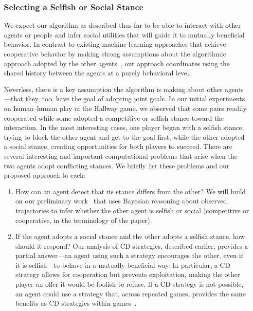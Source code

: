 
\subsubsection*{\large Selecting a Selfish or Social Stance}
\label{sec:stance}

We expect our algorithm as described thus far to be able to interact
with other agents or people and infer social utilities that will guide
it to mutually beneficial behavior. In contrast to existing
machine-learning approaches that achieve cooperative behavior by
making strong assumptions about the algorithmic approach adopted by
the other agents~\cite{conitzer07}, our approach coordinates using the
shared history between the agents at a purely behavioral level.

Neverless, there is a key assumption the algorithm is making about
other agents---that they, too, have the goal of adopting joint
goals. In our initial experiments on human--human play in the Hallway
game, we observed that some pairs readily cooperated while some
adopted a competitive or selfish stance toward the interaction. In the
most interesting cases, one player began with a selfish stance, trying
to block the other agent and get to the goal first, while the other
adopted a social stance, creating opportunities for both players to
succeed. There are several interesting and important computational
problems that arise when the two agents adopt conflicting stances. We
briefly list these problems and our proposed approach to each:
\begin{enumerate}
\item How can an agent detect that its stance differs from the other?
  We will build on our preliminary work~\cite{kleiman16} that uses
  Bayesian reasoning about observed trajectories to infer whether the
  other agent is selfish or social (competitive or cooperative, in the
  terminology of the paper).
\item If the agent adopts a social stance and the other adopts a
  selfish stance, how should it respond? Our analysis of CD
  strategies, described earlier, provides a partial answer---an agent
  using such a strategy encourages the other, even if it is
  selfish---to behave in a mutually beneficial way. In particular, a
  CD strategy allows for cooperation but prevents exploitation, making
  the other player an offer it would be foolish to refuse. If a CD
  strategy is not possible, an agent could use a strategy that, across
  repeated games, provides the same benefits as CD strategies within
  games~\cite{munoz08}.
\end{enumerate}
